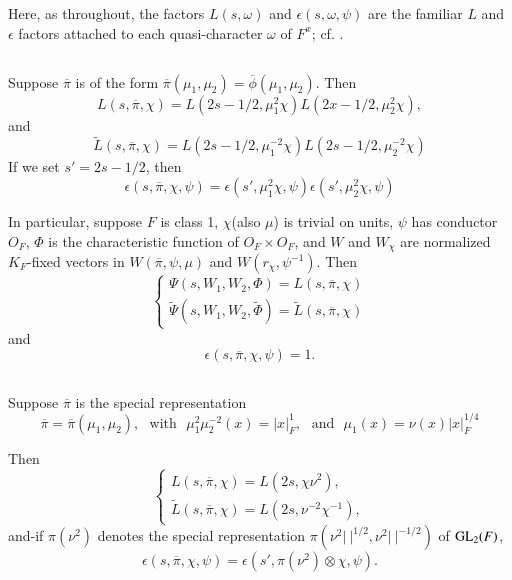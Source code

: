 Here, as throughout, the factors $L(s,\omega)$ and $\epsilon(s,\omega,\psi)$ are the familiar $L$ and $\epsilon$ factors attached to each quasi-character $\omega$ of $F^{x}$; cf. \cite[pp. 108-109]{Jacquet-Langlands}.

\subsection{}\label{art1-sec6.2}
Suppose $\overline{\pi}$ is of the form $\overline{\pi}(\mu_{1},\mu_{2})=\overline{\phi}(\mu_{1},\mu_{2})$. Then
$$
L(s,\overline{\pi},\chi)=L(2s-1/2,\mu^{2}_{1}\chi)L(2x-1/2,\mu^{2}_{2}\chi),
$$
and
\setcounter{equation}{0}
\begin{equation}
\widetilde{L}(s,\overline{\pi},\chi)=L(2s-1/2,\mu^{-2}_{1}\chi)L(2s-1/2,\mu^{-2}_{2}\chi)\label{art1-eq6.2.1}
\end{equation}
If we set $s'=2s-1/2$, then
\begin{equation}
\epsilon(s,\overline{\pi},\chi,\psi)=\epsilon(s',\mu^{2}_{1}\chi,\psi)\epsilon(s',\mu^{2}_{2}\chi,\psi)\label{art1-eq6.2.2}
\end{equation}

In particular, suppose $F$ is class 1, $\chi$(also $\mu$) is trivial on units, $\psi$ has conductor $O_{F}$, $\Phi$ is the characteristic function of $O_{F}\times O_{F}$, and $W$ and $W_{\chi}$ are normalized $K_{F}$-fixed vectors in $W(\overline{\pi},\psi,\mu)$ and $W(r_{\chi},\psi^{-1})$. Then
\begin{equation}
\begin{cases}
\Psi(s,W_{1},W_{2},\Phi)=L(s,\overline{\pi},\chi)\\
\widetilde{\Psi}(s,W_{1},W_{2},\widetilde{\Phi})=\widetilde{L}(s,\overline{\pi},\chi)
\end{cases}\label{art1-eq6.2.3}
\end{equation}
and
$$
\epsilon(s,\overline{\pi},\chi,\psi)=1.
$$

\subsection{}\label{art1-sec6.3}
Suppose $\overline{\pi}$ is the special representation
$$
\overline{\pi}=\overline{\pi}(\mu_{1},\mu_{2}),\text{~ with~ }\mu^{2}_{1}\mu^{-2}_{2}(x)=|x|^{1}_{F},\text{~ and~ } \mu_{1}(x)=\nu(x)|x|^{1/4}_{F}
$$

Then
$$
\begin{cases}
L(s,\overline{\pi},\chi)=L(2s,\chi\nu^{2}),\\
\widetilde{L}(s,\overline{\pi},\chi)=L(2s,\nu^{-2}\chi^{-1}),
\end{cases}
$$
and-if $\pi(\nu^{2})$ denotes the special representation $\pi(\nu^{2}|~|^{1/2},\nu^{2}|~|^{-1/2})$ of $\mathrm{GL}_{2}(F)$,
$$
\epsilon(s,\overline{\pi},\chi,\psi)=\epsilon(s',\pi(\nu^{2})\otimes \chi,\psi).
$$

